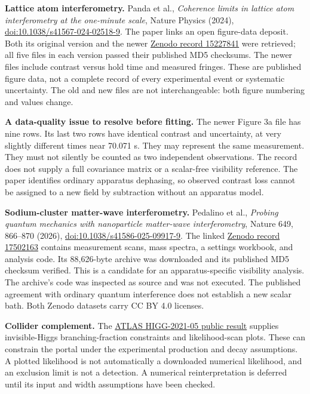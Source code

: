 \documentclass[11pt]{article}
\begin{document}
\textbf{Lattice atom interferometry.}
Panda et al., \emph{Coherence limits in lattice atom interferometry at the
one-minute scale}, Nature Physics (2024),
\href{https://doi.org/10.1038/s41567-024-02518-9}{doi:10.1038/s41567-024-02518-9}.
The paper links an open figure-data deposit. Both its original version
and the newer \href{https://zenodo.org/records/15227841}{Zenodo record 15227841}
were retrieved; all five files in each version passed their published MD5
checksums. The newer files include contrast versus hold time and measured
fringes. These are published figure data, not a complete record of every
experimental event or systematic uncertainty. The old and new files are
not interchangeable: both figure numbering and values change.

\textbf{A data-quality issue to resolve before fitting.}
The newer Figure 3a file has nine rows. Its last two rows have identical
contrast and uncertainty, at very slightly different times near 70.071 s.
They may represent the same measurement. They must not silently be counted
as two independent observations. The record does not supply a full
covariance matrix or a scalar-free visibility reference. The paper identifies
ordinary apparatus dephasing, so observed contrast loss cannot be assigned
to a new field by subtraction without an apparatus model.

\textbf{Sodium-cluster matter-wave interferometry.}
Pedalino et al., \emph{Probing quantum mechanics with nanoparticle matter-wave
interferometry}, Nature 649, 866--870 (2026),
\href{https://doi.org/10.1038/s41586-025-09917-9}{doi:10.1038/s41586-025-09917-9}.
The linked \href{https://zenodo.org/records/17502163}{Zenodo record 17502163}
contains measurement scans, mass spectra, a settings workbook, and analysis
code. Its 88,626-byte archive was downloaded and its published MD5 checksum
verified. This is a candidate for an apparatus-specific visibility analysis.
The archive's code was inspected as source and was not executed. The
published agreement with ordinary quantum interference does not establish
a new scalar bath. Both Zenodo datasets carry CC BY 4.0 licenses.

\textbf{Collider complement.}
The \href{https://atlas.web.cern.ch/Atlas/GROUPS/PHYSICS/PAPERS/HIGG-2021-05/index.php}
{ATLAS HIGG-2021-05 public result} supplies invisible-Higgs branching-fraction
constraints and likelihood-scan plots. These can constrain the portal under
the experimental production and decay assumptions. A plotted likelihood
is not automatically a downloaded numerical likelihood, and an exclusion
limit is not a detection. A numerical reinterpretation is deferred until its
input and width assumptions have been checked.
\end{document}
